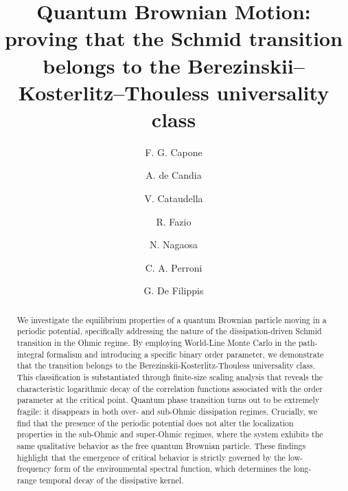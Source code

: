 \documentclass[aps,notitlepage,twocolumn,prl,nolongbibliography,superscriptaddress]{revtex4-2}
\begin{document}
\title{Quantum Brownian Motion: proving that the Schmid transition belongs to the Berezinskii–Kosterlitz–Thouless universality class}

\author{F. G. Capone}

\author{A. de Candia}

\author{V. Cataudella}

\author{R. Fazio}

\author{N. Nagaosa}

\author{C. A. Perroni}

\author{G. De Filippis}


\begin{abstract}
We investigate the equilibrium properties of a quantum Brownian particle moving in a periodic potential, specifically addressing the nature of the dissipation-driven Schmid transition in the Ohmic regime. By employing World-Line Monte Carlo in the path-integral formalism and introducing a specific binary order parameter, we demonstrate that the transition belongs to the Berezinskii-Kosterlitz-Thouless universality class. This classification is substantiated through finite-size scaling analysis that reveals the characteristic logarithmic decay of the correlation functions associated with the order parameter at the critical point. Quantum phase transition turns out to be extremely fragile: it disappears in both over- and sub-Ohmic dissipation regimes. Crucially, we find that the presence of the periodic potential does not alter the localization properties in the sub-Ohmic and super-Ohmic regimes, where the system exhibits the same qualitative behavior as the free quantum Brownian particle. These findings highlight that the emergence of critical behavior is strictly governed by the low-frequency form of the environmental spectral function, which determines the long-range temporal decay of the dissipative kernel.
\end{abstract}
\end{document}
